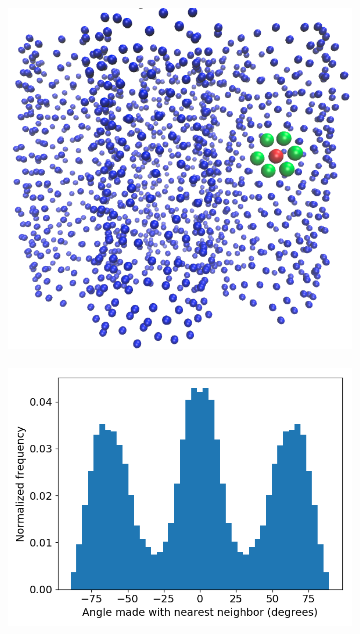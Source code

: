 \documentclass{article}
\begin{document}
  \begin{figure}[!htb]
        \centering
        \begin{subfigure}{0.45\textwidth}
        \includegraphics[width=\textwidth]{centroids.png}
		\caption{}\label{fig:centroids}
        \end{subfigure}
        \begin{subfigure}{0.45\textwidth}
        \includegraphics[width=\textwidth]{hexagonal_tail_packing.png}

\end{subfigure}
\end{figure}
\end{document}

